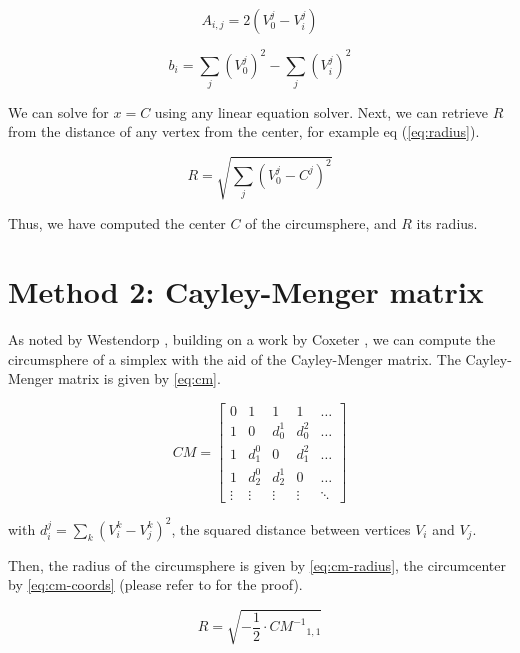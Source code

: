 \begin{equation} \label{eq:a}
A_{i,j} = 2 \left( V_0^j - V_i^j \right)
\end{equation}

\begin{equation} \label{eq:b}
b_{i} = \sum_j \left( V_0^j \right)^2 - \sum_j \left( V_i^j \right)^2
\end{equation}

We can solve for $x = C$ using any linear equation solver. Next, we can
retrieve $R$ from the distance of any vertex from the center, for example
eq (\cref{eq:radius}).

\begin{equation} \label{eq:radius}
R = \sqrt{\sum_j \left( V_0^j - C^j \right)^2}
\end{equation}

Thus, we have computed the center $C$ of the circumsphere, and $R$ its radius.

\section{Method 2: Cayley-Menger matrix}
As noted by Westendorp \cite{Westendorp:2013}, building on a work by Coxeter
\cite{Coxeter:1930}, we can compute the circumsphere of a simplex with the aid
of the Cayley-Menger matrix.  The Cayley-Menger matrix is given by
\cref{eq:cm}.

\begin{equation} \label{eq:cm}
CM = \begin{bmatrix}
0 & 1 & 1 & 1 & \dots \\
1 & 0 & d_0^1 & d_0^2 & \dots \\
1 & d_1^0 & 0 & d_1^2 & \dots \\
1 & d_2^0 & d_2^1 & 0 & \dots \\
\vdots & \vdots & \vdots & \vdots & \ddots
\end{bmatrix}
\end{equation}

with $d_i^j = \sum_k \left( V_i^k - V_j^k \right)^2$, the squared distance
between vertices $V_i$ and $V_j$.

Then, the radius of the circumsphere is given by \cref{eq:cm-radius}, the
circumcenter by \cref{eq:cm-coords} (please refer to \cite{Westendorp:2013} for
the proof).

\begin{equation} \label{eq:cm-radius}
R = \sqrt{- \frac{1}{2} \cdot {CM^{-1}}_{1,1}}
\end{equation}

